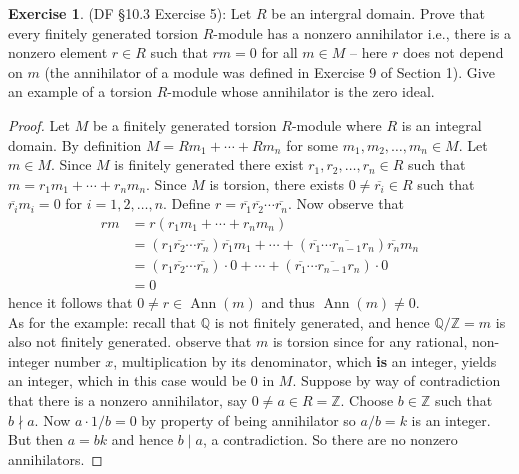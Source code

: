\documentclass[8pt]{amsart}
\theoremstyle{plain}%
\theoremstyle{definition}
\newtheorem*{exercise}{Exercise}%
\theoremstyle{remark}
\numberwithin{equation}{section}
\newcommand{\Z}{\mathbb{Z}}
\newcommand{\Q}{\mathbb{Q}}
\begin{document}
\begin{exercise}
(DF \S 10.3 Exercise 5): Let $R$ be an intergral domain. Prove that every finitely generated torsion $R$-module has a nonzero annihilator i.e., there is a nonzero element $r \in R$ such that $rm = 0$ for all $m \in M$ -- here $r$ does not depend on $m$ (the annihilator of a module was defined in Exercise 9 of Section 1). Give an example of a torsion $R$-module whose annihilator is the zero ideal.
	\begin{proof}
		Let $M$ be a finitely generated torsion $R$-module where $R$ is an integral domain. By definition $M = Rm_1 + \cdots + Rm_n$ for some $m_1, m_2, \ldots, m_n \in M$. Let $m \in M$. Since $M$ is finitely generated there exist $r_1, r_2, \ldots, r_n \in R$ such that $m = r_1m_1 + \cdots + r_nm_n$. Since $M$ is torsion, there exists $0 \neq \overline{r_i} \in R$ such that $\overline{r_i}m_i = 0$ for $i = 1, 2, \ldots, n$. Define $r = \overline{r_1} \overline{r_2} \cdots \overline{r_n}$. Now observe that
		\begin{align*}
			rm &= r(r_1m_1 + \cdots + r_nm_n)\\
			&= (r_1 \overline{r_2} \cdots \overline{r_n})\overline{r_1}m_1 + \cdots + (\overline{r_1} \cdots \overline{r_{n-1}} r_n) \overline{r_n}m_n\\
			&= (r_1 \overline{r_2} \cdots \overline{r_n}) \cdot 0 + \cdots + (\overline{r_1} \cdots \overline{r_{n-1}} r_n) \cdot 0\\
			&= 0
		\end{align*}
		hence it follows that $0 \neq r \in \operatorname{Ann}(m)$ and thus $\operatorname{Ann}(m) \neq 0$.\\

		As for the example: recall that $\Q$ is not finitely generated, and hence $\Q/\Z = m$ is also not finitely generated. observe that $m$ is torsion since for any rational, non-integer number $x$, multiplication by its denominator, which \textbf{is} an integer, yields an integer, which in this case would be 0 in $M$. Suppose by way of contradiction that there is a nonzero annihilator, say $0 \neq a \in R = \Z$. Choose $b \in \Z$ such that $b \nmid a$. Now $a \cdot 1/b = 0$ by property of being annihilator so $a/b = k$ is an integer. But then $a = bk$ and hence $b \mid a$, a contradiction. So there are no nonzero annihilators.
	\end{proof}
\end{exercise}
\end{document}
